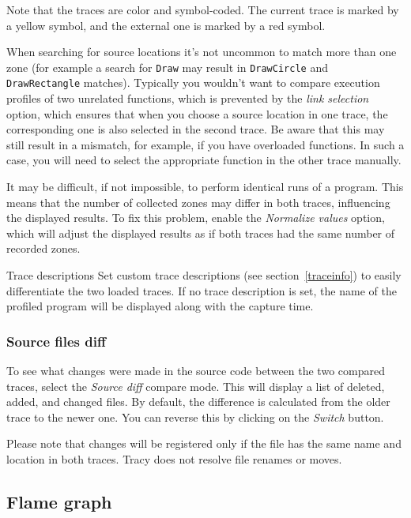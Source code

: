 \documentclass[hidelinks,titlepage,a4paper,twoside]{article}
\begin{document}
Note that the traces are color and symbol-coded. The current trace is marked by a yellow \faLemon{} symbol, and the external one is marked by a red \faGem{} symbol.

When searching for source locations it's not uncommon to match more than one zone (for example a search for \texttt{Draw} may result in \texttt{DrawCircle} and \texttt{DrawRectangle} matches). Typically you wouldn't want to compare execution profiles of two unrelated functions, which is prevented by the \emph{link selection} option, which ensures that when you choose a source location in one trace, the corresponding one is also selected in the second trace. Be aware that this may still result in a mismatch, for example, if you have overloaded functions. In such a case, you will need to select the appropriate function in the other trace manually.

It may be difficult, if not impossible, to perform identical runs of a program. This means that the number of collected zones may differ in both traces, influencing the displayed results. To fix this problem, enable the \emph{Normalize values} option, which will adjust the displayed results as if both traces had the same number of recorded zones.

\begin{bclogo}[
noborder=true,
couleur=black!5,
logo=\bclampe
]{Trace descriptions}
Set custom trace descriptions (see section~\ref{traceinfo}) to easily differentiate the two loaded traces. If no trace description is set, the name of the profiled program will be displayed along with the capture time.
\end{bclogo}

\subsubsection{Source files diff}

To see what changes were made in the source code between the two compared traces, select the \emph{Source diff} compare mode. This will display a list of deleted, added, and changed files. By default, the difference is calculated from the older trace to the newer one. You can reverse this by clicking on the \emph{Switch} button.

Please note that changes will be registered only if the file has the same name and location in both traces. Tracy does not resolve file renames or moves.

\subsection{Flame graph}
\label{flamegraph}
\end{document}
